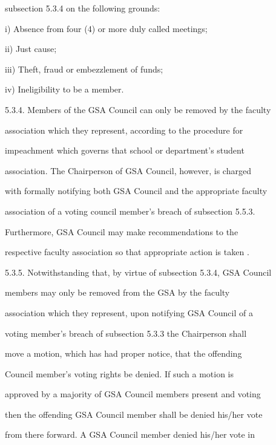 \documentclass{article}
\begin{document}
subsection 5.3.4  on the following grounds:  



i)      Absence from four (4) or more duly called meetings;  



ii)     Just cause;  



iii)    Theft, fraud or embezzlement of funds;  



iv)     Ineligibility to be a member.  



5.3.4. Members  of  the  GSA  Council  can  only  be  removed  by  the  faculty  

association  which  they  represent,  according  to  the  procedure  for  

impeachment   which   governs   that   school   or   department’s   student  

association.  The  Chairperson  of  GSA  Council,  however,  is  charged  

with formally notifying both GSA Council and the appropriate faculty  

association  of  a  voting  council  member's  breach  of  subsection  5.5.3.  

Furthermore,       GSA      Council   may   make   recommendations   to   the  

respective faculty association so that appropriate action is taken .  



5.3.5. Notwithstanding  that,  by  virtue  of  subsection  5.3.4,  GSA  Council  

members   may   only   be   removed   from   the   GSA   by   the   faculty  

association  which  they  represent,  upon  notifying  GSA  Council  of  a  

voting  member's  breach  of  subsection  5.3.3  the  Chairperson  shall  

move  a  motion,  which  has  had  proper  notice,  that  the  offending  

Council   member's   voting   rights   be   denied.   If   such   a   motion   is  

approved by a majority of GSA Council members present and voting  

then the offending GSA Council member shall be denied his/her vote  

from  there  forward.  A  GSA  Council  member  denied  his/her  vote  in  
\end{document}
